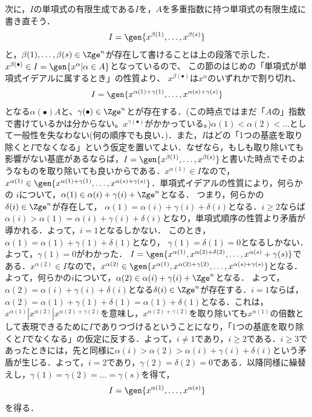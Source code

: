 \begin{myproof}
次に，$I$の単項式の有限生成である$I$を，$A$を多重指数に持つ単項式の有限生成に書き直そう．
\begin{align}
 I=\gen{x^{\beta(1)},\dots,x^{\beta(s)}}
\end{align}
と，$\beta(1),\dots,\beta(s)\in \Zge^n$が存在して書けることは上の段落で示した．
$x^{\beta(\bullet)} \in I = \gen{x^\alpha | \alpha \in A}$となっているので、
この節のはじめの「単項式が単項式イデアルに属するとき」の性質より、
$x^{\beta(\bullet)}$は$x^\alpha$のいずれかで割り切れ、
\begin{align}
 I=\gen{x^{\alpha(1)+\gamma(1)},\dots,x^{\alpha(s)+\gamma(s)}}
\end{align}
となる$\alpha(\bullet) A$と、$\gamma(\bullet )\in \Zge^n$とが存在する．(この時点ではまだ「$A$の」指数で書けているかは分からない。$x^{\gamma(\bullet)}$がかかっている。)$\alpha(1)< \alpha(2)< \dots$として一般性を失なわない(何の順序でも良い．)．また，$I$はどの「1つの基底を取り除くと$I$でなくなる」という仮定を置いてよい．なぜなら，もしも取り除いても影響がない基底があるならば，$I=\gen{x^{\beta(1)},\dots,x^{\beta(s)}}$と書いた時点でそのようなものを取り除いても良いからである．$x^{\alpha(1)}\in I$なので，$x^{\alpha(1)}\in \gen{x^{\alpha(1)+\gamma(1)},\dots,x^{\alpha(s)+\gamma(s)}}$．単項式イデアルの性質により，何らかの
$i$について，$\alpha(1) \in \alpha(i)+\gamma(i) + \Zge^n$となる．
 つまり，何らかの$\delta(i)\in \Zge^n$が存在して，
$\alpha(1)=\alpha(i)+\gamma(i)+\delta(i)$となる．$i\ge 2$ならば
$\alpha(i)>\alpha(1)=\alpha(i)+\gamma(i)+\delta(i)$となり，単項式順序の性質より矛盾が導かれる．よって，$i=1$となるしかない．
 このとき，$\alpha(1)=\alpha(1)+\gamma(1)+\delta(1)$となり，
$\gamma(1)=\delta(1)=0$となるしかない．よって，$\gamma(1)=0$がわかった．
$I=\gen{x^{\alpha(1)},x^{\alpha(2)+\delta(2)},\dots,x^{\alpha(s)}+\gamma(s)}$である．$x^{\alpha(2)}\in I$なので，$x^{\alpha(2)}\in \gen{x^{\alpha(1)},x^{\alpha(2)+\gamma(2)},\dots,x^{\alpha(s)+\gamma(s)}}$となる．
よって，何らかの$i$について，$\alpha(2)\in \alpha(i) + \gamma(i)+\Zge^n$となる．
よって，$\alpha(2)=\alpha(i)+\gamma(i)+\delta(i)$となる$\delta(i)\in \Zge^n$が存在する．$i=1$ならば，$\alpha(2)=\alpha(1)+\gamma(1)+\delta(1)=\alpha(1)+\delta(1)$となる．これは，$x^{\alpha(1)}|x^{\alpha(2)}|x^{\alpha(2)+\gamma(2)}$を意味し，$x^{\alpha(2)+\gamma(2)}$を取り除いても$x^{\alpha(1)}$の倍数として表現できるために$I$でありつづけるということになり，「1つの基底を取り除くと$I$でなくなる」の仮定に反する．よって，$i\neq 1$であり，$i\ge 2$である．$i\ge 3$であったときには，先と同様に$\alpha(i)>\alpha(2)>\alpha(i)+\gamma(i)+\delta(i)$という矛盾が生じる．よって，$i=2$であり，$\gamma(2)=\delta(2)=0$である．以降同様に繰替えし，$\gamma(1)=\gamma(2)=\dots = \gamma(s)$を得て，
\begin{align}
 I=\gen{x^{\alpha(1)},\dots,x^{\alpha(s)}}
\end{align}
を得る．
\end{myproof}

